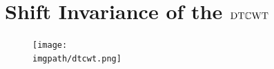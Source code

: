 \section{Shift Invariance of the $\mathrm{DT}\mathbb{C}\mathrm{WT}$}
\begin{figure}
  \texttt{[image: \\imgpath/dtcwt.png]}
\end{figure}

